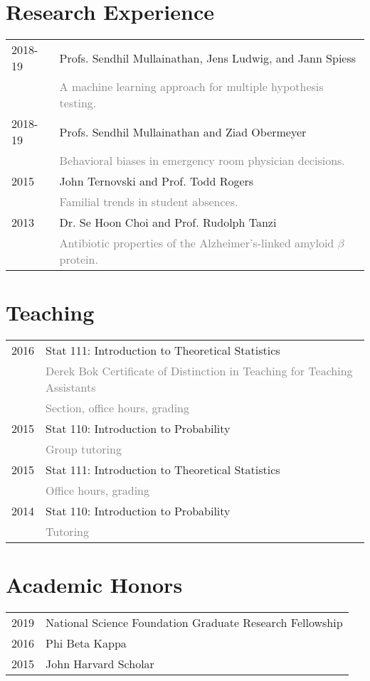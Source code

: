 \documentclass[12pt]{article}
\begin{document}
\section*{Research Experience}
\label{sec:research_experience}
\begin{tabular}{p{\spancolumn} l}
2018-19 & Profs. Sendhil Mullainathan, Jens Ludwig, and Jann Spiess \\
        & \textcolor{gray}{A machine learning approach for multiple hypothesis testing.} \\
2018-19 & Profs. Sendhil Mullainathan and Ziad Obermeyer \\
        & \textcolor{gray}{Behavioral biases in emergency room physician decisions.} \\
2015    & John Ternovski and Prof. Todd Rogers \\
        & \textcolor{gray}{Familial trends in student absences.} \\
2013    & Dr. Se Hoon Choi and Prof. Rudolph Tanzi \\
        & \textcolor{gray}{Antibiotic properties of the Alzheimer's-linked amyloid $\beta$ protein.}
\end{tabular}

\section*{Teaching}
\label{sec:teaching}
\begin{tabular}{p{\datecolumn} l}
2016 & Stat 111: Introduction to Theoretical Statistics \\
     & \textcolor{gray}{Derek Bok Certificate of Distinction in Teaching for Teaching Assistants} \\
     & \textcolor{gray}{Section, office hours, grading} \\
2015 & Stat 110: Introduction to Probability \\
     & \textcolor{gray}{Group tutoring} \\
2015 & Stat 111: Introduction to Theoretical Statistics \\
     & \textcolor{gray}{Office hours, grading} \\
2014 & Stat 110: Introduction to Probability \\
     & \textcolor{gray}{Tutoring} \\
\end{tabular}

\section*{Academic Honors}
\label{sec:academic_honors}
\begin{tabular}{p{\datecolumn} l}
2019 & National Science Foundation Graduate Research Fellowship \\
2016 & Phi Beta Kappa \\
2015 & John Harvard Scholar
\end{tabular}
\end{document}
